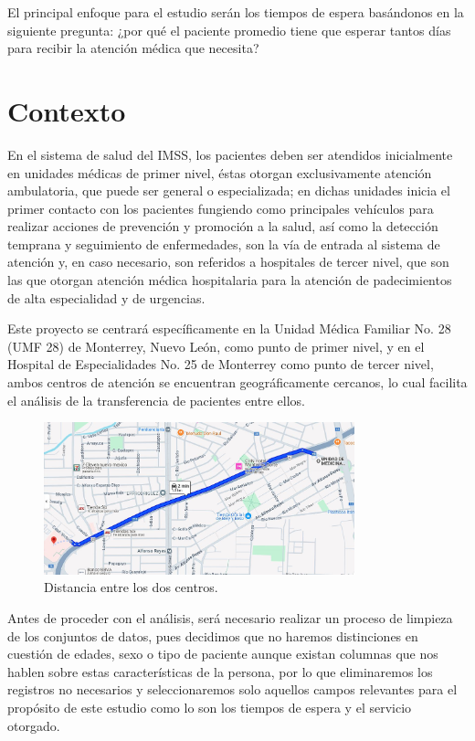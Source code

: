\documentclass[10pt]{article}
\begin{document}
    El principal enfoque para el estudio serán los tiempos de espera basándonos en la siguiente pregunta: ¿por qué el paciente promedio tiene que esperar tantos días para recibir la atención médica que necesita?

	\section{Contexto} \label{sec:contexto}
	En el sistema de salud del IMSS, los pacientes deben ser atendidos inicialmente en unidades médicas de primer nivel, éstas otorgan exclusivamente atención ambulatoria, que puede ser general o especializada; en dichas unidades inicia el primer contacto con los pacientes fungiendo como principales vehículos para realizar acciones de prevención y promoción a la salud, así como la detección temprana y seguimiento de enfermedades, son la vía de entrada al sistema de atención y, en caso necesario, son referidos a hospitales de tercer nivel, que son las que otorgan atención médica hospitalaria para la atención de padecimientos de alta especialidad y de urgencias.
	
    Este proyecto se centrará específicamente en la Unidad Médica Familiar No. 28 (UMF 28) de Monterrey, Nuevo León, como punto de primer nivel, y en el Hospital de Especialidades No. 25 de Monterrey como punto de tercer nivel, ambos centros de atención se encuentran geográficamente cercanos, lo cual facilita el análisis de la transferencia de pacientes entre ellos.
    
    \begin{figure}[h]
		\centering
		\includegraphics[width=90mm]{./images/mapa.jpg}
		\caption{Distancia entre los dos centros.}
	\end{figure}
	\FloatBarrier

    Antes de proceder con el análisis, será necesario realizar un proceso de limpieza de los conjuntos de datos, pues decidimos que no haremos distinciones en cuestión de edades, sexo o tipo de paciente aunque existan columnas que nos hablen sobre estas características de la persona, por lo que eliminaremos los registros no necesarios y seleccionaremos solo aquellos campos relevantes para el propósito de este estudio como lo son los tiempos de espera y el servicio otorgado.
    
\end{document}
